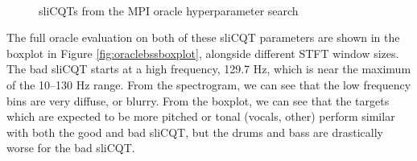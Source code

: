 \documentclass[report.tex]{subfiles}
\begin{document}
\begin{figure}[ht]
	\centering
	\\
	\caption{sliCQTs from the MPI oracle hyperparameter search}
	\label{fig:bipolarslicqs}
\end{figure}

The full oracle evaluation on both of these sliCQT parameters are shown in the boxplot in Figure \ref{fig:oraclebssboxplot}, alongside different STFT window sizes. The bad sliCQT starts at a high frequency, 129.7 Hz, which is near the maximum of the 10--130 Hz range. From the spectrogram, we can see that the low frequency bins are very diffuse, or blurry. From the boxplot, we can see that the targets which are expected to be more pitched or tonal (vocals, other) perform similar with both the good and bad sliCQT, but the drums and bass are drastically worse for the bad sliCQT.
\end{document}
